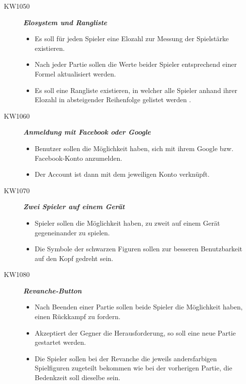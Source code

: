 \documentclass[parskip=full]{scrartcl}
\begin{document}
\begin{description}
		\item[KW1050] \textbf{\textit{\gls{Elo}system und Rangliste}}
		\begin{itemize}
			\item Es soll für jeden Spieler eine \gls{Elo}zahl zur Messung der Spielstärke existieren.
			\item Nach jeder Partie sollen die Werte beider Spieler entsprechend einer Formel aktualisiert werden.
			\item Es soll eine Rangliste existieren, in welcher alle Spieler anhand ihrer \gls{Elo}zahl in absteigender Reihenfolge gelistet werden .
		\end{itemize}
		
		\item[KW1060] \textbf{\textit{Anmeldung mit Facebook oder Google}}
		\begin{itemize}
			\item Benutzer sollen die Möglichkeit haben, sich mit ihrem Google bzw. Facebook-Konto anzumelden.
			\item Der Account ist dann mit dem jeweiligen Konto verknüpft.
		\end{itemize}
		
		\item[KW1070] \textbf{\textit{Zwei Spieler auf einem Gerät}}
		\begin{itemize}
			\item Spieler sollen die Möglichkeit haben, zu zweit auf einem Gerät gegeneinander zu spielen.
			\item Die Symbole der schwarzen Figuren sollen zur besseren Benutzbarkeit auf den Kopf gedreht sein.
		\end{itemize}
		
		\item[KW1080] \textbf{\textit{\gls{Revanche}-Button}}
		\begin{itemize}
			\item Nach Beenden einer Partie sollen beide Spieler die Möglichkeit haben, einen Rückkampf zu fordern.
			\item Akzeptiert der Gegner die Herausforderung, so soll eine neue Partie gestartet werden.
			\item Die Spieler sollen bei der Revanche die jeweils andersfarbigen Spielfiguren zugeteilt bekommen wie bei der vorherigen Partie, die \gls{Bedenkzeit} soll dieselbe sein.
		\end{itemize}
		
	\end{description}
\end{document}
